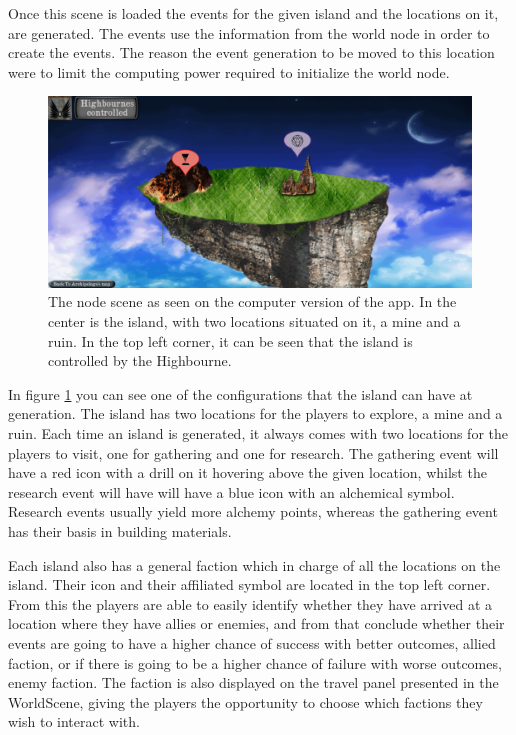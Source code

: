 Once this scene is loaded the events for the given island and the locations on it, are generated. The events use the information from the world node in order to create the events. The reason the event generation to be moved to this location were to limit the computing power required to initialize the world node. 

\begin{figure}[!ht]
    \centering
    \includegraphics[width=\textwidth]{Images/NodeScene.png}
    \caption{The node scene as seen on the computer version of the app. In the center is the island, with two locations situated on it, a mine and a ruin. In the top left corner, it can be seen that the island is controlled by the Highbourne.}
    \label{fig:nodescene}
\end{figure}

In figure \ref{fig:nodescene} you can see one of the configurations that the island can have at generation. The island has two locations for the players to explore, a mine and a ruin. 
Each time an island is generated, it always comes with two locations for the players to visit, one for gathering and one for research. The gathering event will have a red icon with a drill on it hovering above the given location, whilst the research event will have will have a blue icon with an alchemical symbol.
Research events usually yield more alchemy points, whereas the gathering event has their basis in building materials.

Each island also has a general faction which in charge of all the locations on the island. Their icon and their affiliated symbol are located in the top left corner. From this the players are able to easily identify whether they have arrived at a location where they have allies or enemies, and from that conclude whether their events are going to have a higher chance of success with better outcomes, allied faction, or if there is going to be a higher chance of failure with worse outcomes, enemy faction.
The faction is also displayed on the travel panel presented in the WorldScene, giving the players the opportunity to choose which factions they wish to interact with.

